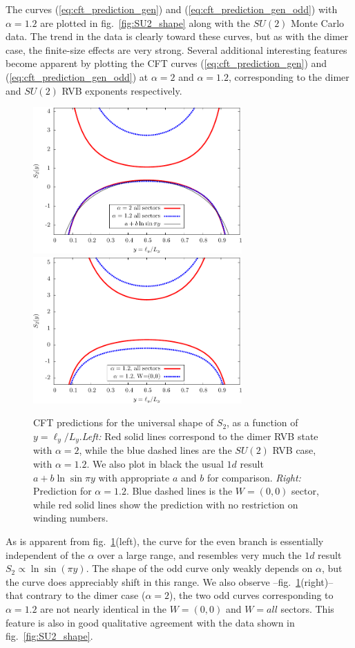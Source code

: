 \documentclass[11pt]{iopart}
\begin{document}
The curves (\ref{eq:cft_prediction_gen}) and (\ref{eq:cft_prediction_gen_odd}) 
 with $\alpha=1.2$ are plotted in fig.~\ref{fig:SU2_shape} along with the $SU(2)$ Monte Carlo data.  The trend in the data is clearly toward these curves, but as with the dimer case, the finite-size effects are very strong. 
Several additional interesting features become apparent by plotting the CFT curves
(\ref{eq:cft_prediction_gen}) and (\ref{eq:cft_prediction_gen_odd}) at $\alpha=2$ and $\alpha=1.2$, corresponding to the dimer and $SU(2)$ RVB exponents respectively.
\begin{figure}[ht]
 \begin{center}
  \includegraphics[width=8cm]{./figures/SUN_CFT.pdf}
    \includegraphics[width=8cm]{./figures/SUN_CFT_w.pdf}
 \end{center}
\caption{CFT predictions for the universal shape of $S_2$, as a function of $y=\ell_y/L_y$.\emph{Left:} Red solid lines correspond to the dimer RVB state with $\alpha=2$, while the blue dashed lines are the $SU(2)$ RVB case, with $\alpha= 1.2$. We also plot in black the usual $1d$ result $a+b\ln \sin \pi y$ with appropriate $a$ and $b$ for comparison. \emph{Right: }Prediction for $\alpha=1.2$. Blue dashed lines is the $W=(0,0)$ sector, while red solid lines show the prediction with no restriction on winding numbers.}
\label{fig:SUN_CFT}
\end{figure}
As is apparent from fig.~\ref{fig:SUN_CFT}(left), the curve for the even branch is essentially independent of the $\alpha$ over a large range, and resembles very much the $1d$ result $S_2\propto\ln \sin (\pi y)$. The shape of the odd curve only weakly depends on $\alpha$, but the curve does appreciably shift in this range. We also observe --fig.~\ref{fig:SUN_CFT}(right)-- that contrary to the dimer case ($\alpha=2$), the two odd curves corresponding to $\alpha=1.2$ are not nearly identical in the $W=(0,0)$ and $W=all$ sectors. This feature is also in good qualitative agreement with the data shown in fig.~\ref{fig:SU2_shape}.
\end{document}
